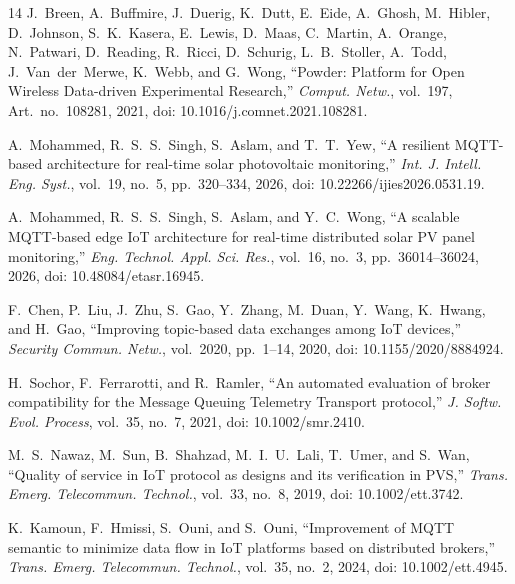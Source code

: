 \documentclass[journal]{IEEEtran}
\begin{document}
\begin{thebibliography}{14}
J.~Breen, A.~Buffmire, J.~Duerig, K.~Dutt, E.~Eide, A.~Ghosh, M.~Hibler, D.~Johnson, S.~K.~Kasera, E.~Lewis, D.~Maas, C.~Martin, A.~Orange, N.~Patwari, D.~Reading, R.~Ricci, D.~Schurig, L.~B.~Stoller, A.~Todd, J.~Van~der~Merwe, K.~Webb, and G.~Wong,
``Powder: Platform for Open Wireless Data-driven Experimental Research,''
\emph{Comput. Netw.}, vol.~197, Art.~no.~108281, 2021,
doi: 10.1016/j.comnet.2021.108281.


A.~Mohammed, R.~S.~S.~Singh, S.~Aslam, and T.~T.~Yew,
``A resilient MQTT-based architecture for real-time solar photovoltaic monitoring,''
\emph{Int. J. Intell. Eng. Syst.}, vol.~19, no.~5, pp.~320--334, 2026,
doi: 10.22266/ijies2026.0531.19.

A.~Mohammed, R.~S.~S.~Singh, S.~Aslam, and Y.~C.~Wong,
``A scalable MQTT-based edge IoT architecture for real-time distributed solar PV panel monitoring,''
\emph{Eng. Technol. Appl. Sci. Res.}, vol.~16, no.~3, pp.~36014--36024, 2026,
doi: 10.48084/etasr.16945.

F.~Chen, P.~Liu, J.~Zhu, S.~Gao, Y.~Zhang, M.~Duan, Y.~Wang, K.~Hwang, and H.~Gao,
``Improving topic-based data exchanges among IoT devices,''
\emph{Security Commun. Netw.}, vol.~2020, pp.~1--14, 2020,
doi: 10.1155/2020/8884924.

H.~Sochor, F.~Ferrarotti, and R.~Ramler,
``An automated evaluation of broker compatibility for the Message Queuing Telemetry Transport protocol,''
\emph{J. Softw. Evol. Process}, vol.~35, no.~7, 2021,
doi: 10.1002/smr.2410.

M.~S.~Nawaz, M.~Sun, B.~Shahzad, M.~I.~U.~Lali, T.~Umer, and S.~Wan,
``Quality of service in IoT protocol as designs and its verification in PVS,''
\emph{Trans. Emerg. Telecommun. Technol.}, vol.~33, no.~8, 2019,
doi: 10.1002/ett.3742.

K.~Kamoun, F.~Hmissi, S.~Ouni, and S.~Ouni,
``Improvement of MQTT semantic to minimize data flow in IoT platforms based on distributed brokers,''
\emph{Trans. Emerg. Telecommun. Technol.}, vol.~35, no.~2, 2024,
doi: 10.1002/ett.4945.
\end{thebibliography}
\end{document}

